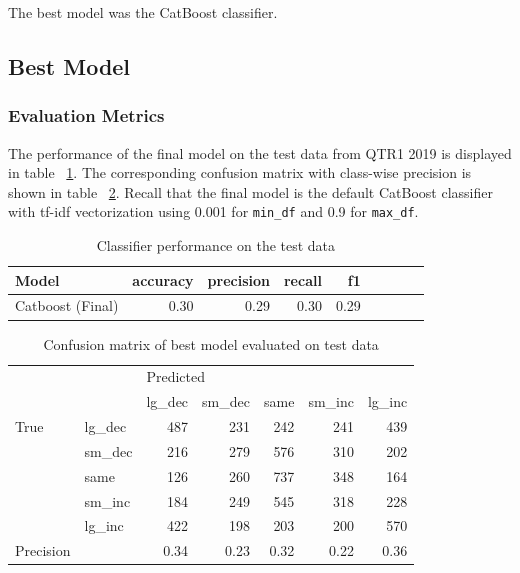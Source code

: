 \documentclass{article}
\begin{document}
	The best model was the CatBoost classifier.

	\subsection{Best Model}
	
	\subsubsection{Evaluation Metrics}

	The performance of the final model on the test data from QTR1 2019 is displayed in table ~\ref{table:results_test}. The corresponding confusion matrix with class-wise precision is shown in table ~\ref{table:best_model_cm_abs}. Recall that the final model is the default CatBoost classifier with tf-idf vectorization using 0.001 for \lstinline{min_df} and 0.9 for \lstinline{max_df}.

	\begin{table}[h!]
	\centering
	\caption{Classifier performance on the test data}
	\label{table:results_test}
	
	\begin{tabular}{lrrrrrrrr}
		\toprule
		Model &     accuracy &     precision &     recall &    f1 \\
		\midrule
		Catboost (Final)   &  0.30 &  0.29 &   0.30 &  0.29 \\
		\bottomrule
	\end{tabular}
	
	\end{table}%


	\begin{table}[h!]
	\centering
	\caption{Confusion matrix of best model evaluated on test data}
	\label{table:best_model_cm_abs}
	
	\begin{tabular}{llrrrrr}
		\toprule
		&        & \multicolumn{5}{l}{Predicted} \\
		&        &    lg\_dec & sm\_dec & same & sm\_inc & lg\_inc \\
		\midrule
		True & lg\_dec &  487 &    231 &  242 &    241 &    439 \\
		& sm\_dec &       216 &    279 &  576 &    310 &    202 \\
		& same &          126 &    260 &  737 &    348 &    164 \\
		& sm\_inc &       184 &    249 &  545 &    318 &    228 \\
		& lg\_inc &       422 &    198 &  203 &    200 &    570 \\
		\bottomrule
		Precision &  &    0.34 &  0.23 &  0.32 &   0.22 &    0.36 \\
		\bottomrule
	\end{tabular}
	
	\end{table}%
\end{document}
